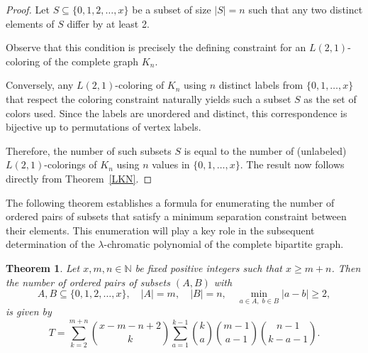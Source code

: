 \documentclass{birkjour}
\newtheorem{theorem}{Theorem}[section]
\theoremstyle{definition}
\theoremstyle{remark}
\numberwithin{equation}{section}
\begin{document}
\begin{proof}
Let \( S \subseteq \{0, 1, 2, \dots, x\} \) be a subset of size \( |S| = n \) such that any two distinct elements of \( S \) differ by at least 2.

Observe that this condition is precisely the defining constraint for an \( L(2,1) \)-coloring of the complete graph \( K_n \).

Conversely, any \( L(2,1) \)-coloring of \( K_n \) using \( n \) distinct labels from \( \{0, 1, \dots, x\} \) that respect the coloring constraint naturally yields such a subset \( S \) as the set of colors used. Since the labels are unordered and distinct, this correspondence is bijective up to permutations of vertex labels.

Therefore, the number of such subsets \( S \) is equal to the number of (unlabeled) \( L(2,1) \)-colorings of \( K_n \) using \( n \) values in \( \{0, 1, \dots, x\} \). The result now follows directly from Theorem~\ref{LKN}.
\end{proof}
The following theorem establishes a formula for enumerating the number of ordered pairs of subsets that satisfy a minimum separation constraint between their elements. This enumeration will play a key role in the subsequent determination of the $\lambda$-chromatic polynomial of the complete bipartite graph.
\begin{theorem}
\label{LKMN}
Let \( x, m, n \in \mathbb{N} \) be fixed positive integers such that \( x \geq m + n \). Then the number of ordered pairs of subsets \( (A, B) \) with
\[
A, B \subseteq \{0, 1, 2, \dots, x\}, \quad |A| = m,\quad |B| = n,\quad \min_{a \in A,\; b \in B} |a - b| \geq 2,
\]
is given by
\[
T = \sum_{k=2}^{m+n} \binom{x - m - n + 2}{k} \sum_{a=1}^{k-1} \binom{k}{a} \binom{m - 1}{a - 1} \binom{n - 1}{k - a - 1}.
\]
\end{theorem}
\end{document}
